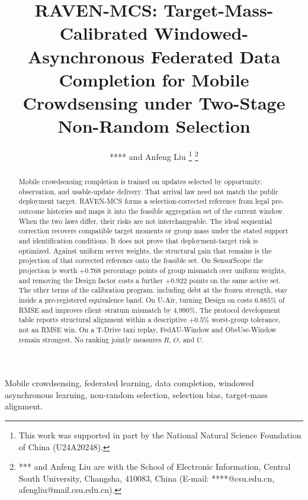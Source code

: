 \documentclass[letterpaper,journal]{IEEEtran}
\begin{document}
\title{RAVEN-MCS: Target-Mass-Calibrated Windowed-Asynchronous Federated Data Completion for Mobile Crowdsensing under Two-Stage Non-Random Selection}

\author{**** and Anfeng Liu%
\thanks{This work was supported in part by the National Natural Science Foundation of China (U24A20248).}%
\thanks{*** and Anfeng Liu are with the School of Electronic Information, Central South University, Changsha, 410083, China (E-mail: ****@csu.edu.cn, afengliu@mail.csu.edu.cn).}%
}


\maketitle


\begin{abstract}
Mobile crowdsensing completion is trained on updates selected by opportunity,
observation, and usable-update delivery.  That arrival law need not match the
public deployment target.  RAVEN-MCS forms a selection-corrected reference from
legal pre-outcome histories and maps it into the feasible aggregation set of the
current window.  When the two laws differ, their risks are not interchangeable.
The ideal sequential correction recovers compatible target moments or group mass
under the stated support and identification conditions.  It does not prove that
deployment-target risk is optimized.  Against uniform server weights, the
structural gain that remains is the projection of that corrected reference onto
the feasible set.  On SensorScope the projection is worth $+0.768$ percentage
points of group mismatch over uniform weights, and removing the Design factor
costs a further $+0.922$ points on the same active set.  The other terms of the
calibration program, including debt at the frozen strength, stay inside a
pre-registered equivalence band.  On U-Air, turning Design on costs $6.885\%$ of
RMSE and improves client--stratum mismatch by $4.990\%$.  The protocol
development table reports structural alignment within a descriptive $+0.5\%$
worst-group tolerance, not an RMSE win.  On a T-Drive taxi replay,
FedAU-Window and ObsUse-Window remain strongest.  No ranking jointly measures
$R$, $O$, and $U$.
\end{abstract}

\begin{IEEEkeywords}
Mobile crowdsensing, federated learning, data completion, windowed asynchronous learning, non-random selection, selection bias, target-mass alignment.
\end{IEEEkeywords}
\end{document}
